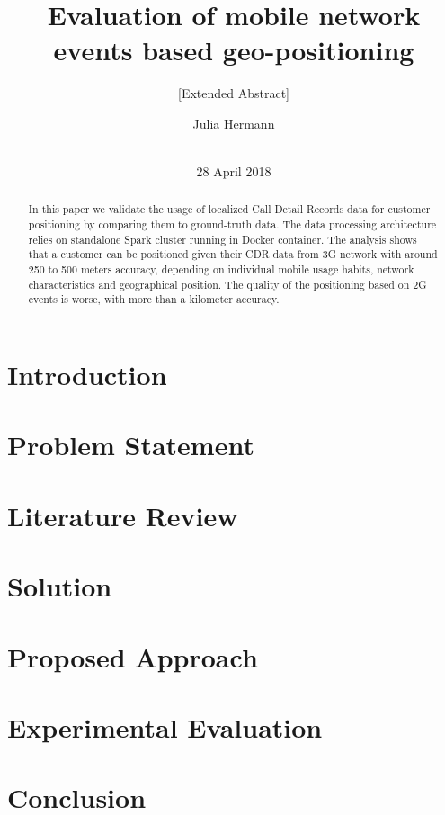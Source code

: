 \documentclass{sig-alternate-05-2015}
\begin{document}
\title{Evaluation of mobile network events based geo-positioning}
\subtitle{[Extended Abstract]}

\author{
\alignauthor
Julia Hermann\\
       \\
}

\maketitle
\date{28 April 2018}
\begin{abstract}
In this paper we validate the usage of localized Call Detail Records data for customer positioning by comparing them to ground-truth data. The data processing architecture relies on standalone Spark cluster running in Docker container. The analysis shows that a customer can be positioned given their CDR data from 3G network with around 250 to 500 meters accuracy, depending on individual mobile usage habits, network characteristics and geographical position. The quality of the positioning based on 2G events is worse, with more than a kilometer accuracy.

\end{abstract}
\section{Introduction}
\section{Problem Statement}
\section{Literature Review}
\section{Solution}
\section{Proposed Approach}
\section{Experimental Evaluation}
\section{Conclusion}



\end{document}
